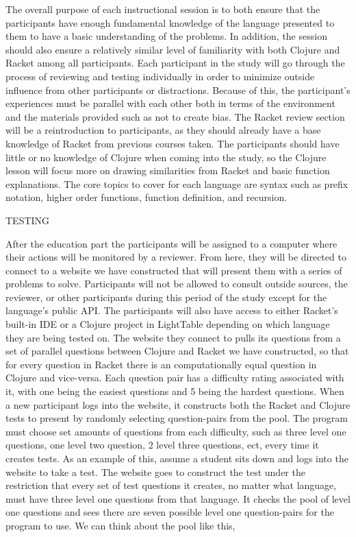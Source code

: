 \documentclass[12pt]{article}
\begin{document}
The overall purpose of each instructional session is to both ensure that the participants have enough fundamental knowledge of the language presented to them to have a basic understanding of the problems. 
In addition, the session should also ensure a relatively similar level of familiarity with both Clojure and Racket among all participants. 
Each participant in the study will go through the process of reviewing and testing individually in order to minimize outside influence from other participants or distractions. 
Because of this, the participant's experiences must be parallel with each other both in terms of the environment and the materials provided such as not to create bias.
The Racket review section will be a reintroduction to participants, as they should already have a base knowledge of Racket from previous courses taken.
The participants should have little or no knowledge of Clojure when coming into the study, so the Clojure lesson will focus more on drawing similarities from Racket and basic function explanations.
The core topics to cover for each language are syntax such as prefix notation, higher order functions, function definition, and recursion.

TESTING

After the education part the participants will be assigned to a computer where their actions will be monitored by a reviewer. 
From here, they will be directed to connect to a website we have constructed that will present them with a series of problems to solve. 
Participants will not be allowed to consult outside sources, the reviewer, or other participants during this period of the study except for the language's public API. 
The participants will also have access to either Racket's built-in IDE or a Clojure project in LightTable depending on which language they are being tested on.
The website they connect to pulls its questions from a set of parallel questions between Clojure and Racket we have constructed, so that for every question in Racket there is an computationally equal question in Clojure and vice-versa.
Each question pair has a difficulty rating associated with it, with one being the easiest questions and 5 being the hardest questions.
When a new participant logs into the website, it constructs both the Racket and Clojure tests to present by randomly selecting question-pairs from the pool. 
The program must choose set amounts of questions from each difficulty, such as three level one questions, one level two question, 2 level three questions, ect, every time it creates tests. 
As an example of this, assume a student sits down and logs into the website to take a test.
The website goes to construct the test under the restriction that every set of test questions it creates, no matter what language, must have three level one questions from that language. 
It checks the pool of level one questions and sees there are seven possible level one question-pairs for the program to use.
We can think about the pool like this,
\end{document}
